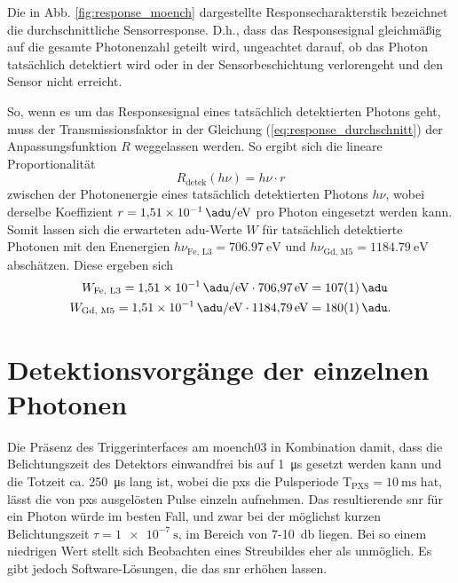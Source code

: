 \noindent
Die in Abb. \ref{fig:response_moench} dargestellte Responsecharakterstik bezeichnet die durchschnittliche Sensorresponse. D.h., dass das Responsesignal gleichmäßig auf die gesamte Photonenzahl geteilt wird, ungeachtet darauf, ob das Photon tatsächlich detektiert wird oder in der Sensorbeschichtung verlorengeht und den Sensor nicht erreicht.

\noindent
So, wenn es um das Responsesignal eines tatsächlich detektierten Photons geht, muss der Transmissionsfaktor in der Gleichung (\ref{eq:response_durchschnitt}) der Anpassungsfunktion $R$ weggelassen werden. So ergibt sich die lineare Proportionalität
\begin{equation}
    R_\text{detek}(h\nu) = h\nu \cdot r
    \label{eq:adu_to_ev}
\end{equation}
zwischen der Photonenergie eines tatsächlich detektierten Photons $h\nu$, wobei derselbe Koeffizient $r = \SI{1.51e-1}{\adu\per\eV}$ pro Photon eingesetzt werden kann. Somit lassen sich die erwarteten \gls{adu}-Werte $W$ für tatsächlich detektierte Photonen mit den Enenergien $h\nu_{\text{Fe, L3}} = \SI{706.97}{\eV}$ und $h\nu_{\text{Gd, M5}} = \SI{1184.79}{\eV}$ abschätzen. Diese ergeben sich 
\begin{equation}
\begin{split}
     W_{\text{Fe, L3}} = \SI{1.51e-1}{\adu\per\eV} \cdot \SI{706.97}{\eV} &=  \SI{107(1)}{\adu}\\
     W_{\text{Gd, M5}} = \SI{1.51e-1}{\adu\per\eV} \cdot \SI{1184.79}{\eV} &=  \SI{180(1)}{\adu}.
\end{split}
\label{eq:auselesewerte_fe_gd}
\end{equation}


\section{Detektionsvorgänge der einzelnen Photonen}
\label{text:single_photon_theorie}
Die Präsenz des Triggerinterfaces am \gls{moench03} in Kombination damit, dass die Belichtungszeit des Detektors einwandfrei bis auf \SI{1}{\micro\second} gesetzt werden kann und die Totzeit ca. \SI{250}{\micro\second} lang ist, wobei die \gls{pxs} die Pulsperiode T$_\text{PXS} = \SI{10}{\milli\second}$ hat, lässt die von \gls{pxs} ausgelösten Pulse einzeln aufnehmen. Das resultierende \gls{snr} für ein Photon würde im besten Fall, und zwar bei der möglichst kurzen Belichtungszeit $\tau = \SI{1e-7}{\second}$, im Bereich von 7-\SI{10}{\decibel} liegen. Bei so einem niedrigen Wert stellt sich Beobachten eines Streubildes eher als unmöglich. Es gibt jedoch Software-Lösungen, die das \gls{snr} erhöhen lassen.  

